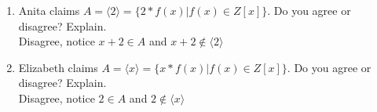 \documentclass{article}
\newcommand{\Z}{\mathbb{Z}}
\begin{document}
\begin{enumerate}
\begin{enumerate}
\begin{proof}
			So, $A$ is an closed under addition.
			
			let $t(x) = xg(x)+ n$ for some  $g(x) \in \Z[x]$ and $n \in \Z$.
			Now Consider, 
			\begin{align*}
				t(x)f_1(x)  &= (xg(x)+ n)(xg_1(x)+2n_1) \\
							&=x(xg(x)g_1(x)+2n_1g(x)+ng_1(x))+ 2n_1n
			\end{align*}
			This show that A satisfies the absorption property and closure under multiplication.
			Therefore A is an ideal.
		\end{proof}
		\item Anita claims $A = \langle2\rangle =\{ 2*f(x)| f(x) \in Z[x] \}$. Do you agree or
		disagree? Explain.\\
		Disagree, notice $x+2 \in A$ and $x+2 \not\in \langle2\rangle$

		\item Elizabeth claims $A = \langle x \rangle =\{ x*f(x)| f(x) \in Z[x] \}$. Do you agree or
		disagree? Explain.\\
		Disagree, notice $2 \in A$ and $2 \not\in \langle x \rangle$ 
	\end{enumerate}



	\end{enumerate}
\end{document}
